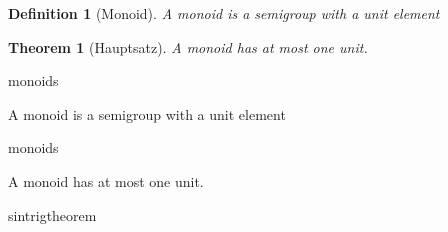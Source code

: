 \newtheorem{thm}{Theorem}[section]
\newtheorem{defn}{Definition}[thm]
\begin{defn}[Monoid]
    A monoid is a semigroup with a unit element
\end{defn}
\begin{thm}[Hauptsatz]
    A monoid has at most one unit.
\end{thm}


\begin{omdoc}
\begin{ommetadata}
\end{ommetadata}

\begin{omtheory}{monoids}
\begin{definition}[Monoid]
  \begin{omverb}
    A monoid is a semigroup with a unit element
  \end{omverb}
\end{definition}
\end{omtheory}

\begin{remark}[Hauptsatz]{monoids}
  \begin{omverb}
    A monoid has at most one unit.
  \end{omverb}
\end{remark}

\begin{omassertion}{sin}{trig}{theorem}
  \begin{omFMP}
  \end{omFMP}
\end{omassertion}

\end{omdoc}
